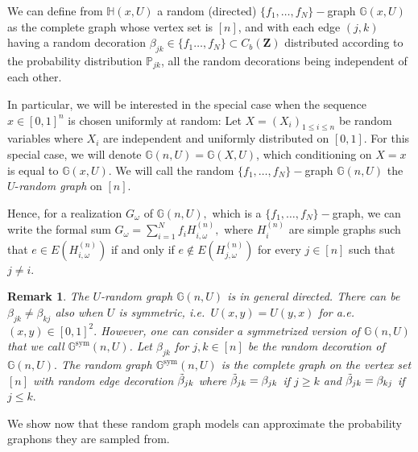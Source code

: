 \documentclass[11pt]{article}
\newtheorem{remark}[theorem]{Remark}
\def\P{\mathbb{P}}
\newcommand{\Space}{\mathbf{Z}}
\newcommand{\CbFunct}{C_b(\Space)}
\renewcommand{\P}{\mathbb{P}}
\begin{document}
We can define from $\mathbb{H}(x, U)$ a random (directed) $\{f_1,\ldots,f_N\}-$graph $\mathbb{G}(x,U)$ as the complete graph whose vertex set is $[n]$, and with each edge $(j, k)$ having a random decoration $\beta_{jk}\in \{f_1\ldots,f_N\}\subset\CbFunct$ distributed according to the probability distribution $\P_{jk}$, all the random decorations being independent of each other. 

In particular, we will be interested in the special case when the sequence $x\in [0,1]^n$ is chosen uniformly at random: Let $X=\left(X_i\right)_{1 \leq i \leq n}$ be random variables where $X_i$ are independent and uniformly distributed on $[0,1].$ For this special case, we will denote $\mathbb{G}(n, U)=\mathbb{G}(X, U)$, which conditioning on $X=x$ is equal to $\mathbb{G}(x, U)$. We will call the random $\{f_1,\ldots,f_N\}-$graph $\mathbb{G}(n, U)$ the $U$-\emph{random graph} on $[n]$.

Hence, for a realization $G_{\omega}$ of $\mathbb{G}(n,U),$ which is a $\{f_1,\ldots,f_N\}-$graph, we can write the formal sum $G_{\omega}=\sum^N_{i=1}f_iH_{i,\omega}^{(n)},$ where $H_i^{(n)}$ are simple graphs such that $e\in E(H_{i,\omega}^{(n)}) $  if and only if $e\notin E(H_{j,\omega}^{(n)}) $ for every $j\in [n]$ such that $j\neq i.$

\begin{remark}
The $U$-random graph $\mathbb{G}(n, U)$ is in general directed. There can be $\beta_{jk}\neq \beta_{kj}$ also when $U$ is symmetric, i.e.\ $U(x,y)=U(y,x)$ for a.e.\ $(x,y)\in [0,1]^2.$ However, one can consider a symmetrized version of $\mathbb{G}(n, U)$ that we call $\mathbb{G}^{\text{sym}}(n, U)$. Let $\beta_{jk}$ for $j,k\in [n]$ be the random decoration of $\mathbb{G}(n, U).$ The random graph $\mathbb{G}^{\text{sym}}(n, U)$ is the complete graph on the vertex set $[n]$ with random edge decoration $\Tilde{\beta}_{jk}$  where $\Tilde{\beta}_{jk}=\beta_{jk}$ if $j\geq k$ and $\Tilde{\beta}_{jk}=\beta_{kj}$ if $j\leq k.$
\end{remark}

We show now that these random graph models can approximate the probability graphons they are sampled from.
\end{document}
